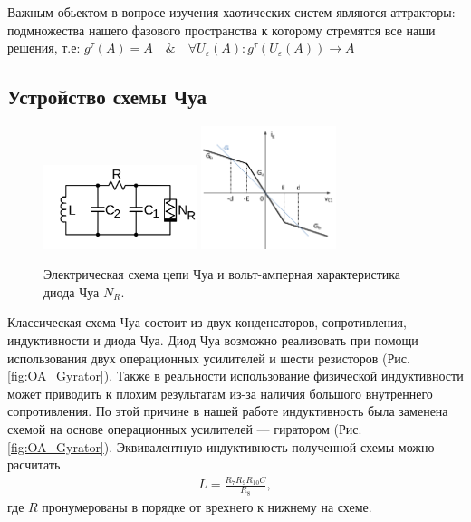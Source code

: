 \documentclass[12pt]{article}
\begin{document}
Важным обьектом в вопросе изучения хаотических систем являются аттракторы: подмножества нашего фазового пространства к которому стремятся все наши решения, т.е:
$g^{\tau}(A) = A \quad\&\quad \forall U_{\varepsilon}(A): g^{\tau}(U_{\varepsilon}(A)) \rightarrow A$

\subsection*{Устройство схемы Чуа}
\begin{figure}[H]
	\centering
	\includegraphics[width=0.4\textwidth]{Base_chua_curcuit.png}
	\hfil
	\includegraphics[width=0.35\textwidth]{chua_VAC.png}
	\caption{Электрическая схема цепи Чуа и вольт-амперная характеристика диода Чуа $N_R$.}
	\label{fig:base_curcuit}
\end{figure}
Классическая схема Чуа состоит из двух конденсаторов, сопротивления, индуктивности и диода Чуа.
Диод Чуа возможно реализовать при помощи использования двух операционных усилителей и шести резисторов (Рис. \ref{fig:OA_Gyrator}).
Также в реальности использование физической индуктивности может приводить к плохим результатам из-за наличия большого внутреннего
сопротивления. По этой причине в нашей работе индуктивность была заменена схемой на основе операционных усилителей --- гиратором (Рис. \ref{fig:OA_Gyrator}).
Эквивалентную индуктивность полученной схемы можно расчитать
\begin{eqnarray}
	L = \frac{R_7 R_9 R_{10} C}{R_8},
	\label{eq:gyrator}
\end{eqnarray}
где $R$ пронумерованы в порядке от врехнего к нижнему на схеме.
\end{document}
